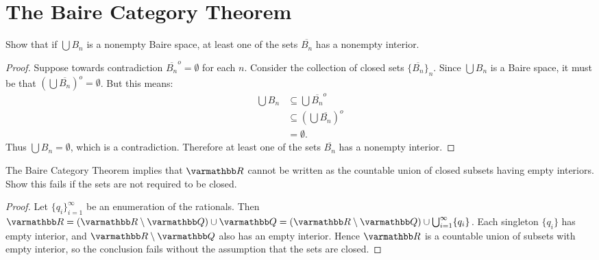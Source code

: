 \documentclass[10pt,twoside,openany]{memoir}
\begin{document}
\newpage
\chapter{The Baire Category Theorem}

\begin{problem}
Show that if $\bigcup B_n$ is a nonempty Baire space, at least one of the sets $\overline{B_n}$ has a nonempty interior.
\end{problem}
    \begin{proof}
        Suppose towards contradiction $\overline{B_n}^o = \emptyset$ for each $n$. Consider the collection of closed sets $\{\overline{B_n}\}_n$. Since $\bigcup B_n$ is a Baire space, it must be that $\left(\bigcup \overline{B_n}\right)^o = \emptyset$. But this means:
            \begin{equation*}
            \begin{split}
                \bigcup B_n 
                & \subseteq \bigcup \overline{B_n}^o \\
                & \subseteq \left( \bigcup \overline{B_n} \right)^o \\
                & = \emptyset.
            \end{split}
            \end{equation*}
        Thus $\bigcup B_n = \emptyset$, which is a contradiction. Therefore at least one of the sets $\overline{B_n}$ has a nonempty interior.
    \end{proof}

\begin{problem}
The Baire Category Theorem implies that $\bfR$ cannot be written as the countable union of closed subsets having empty interiors. Show this fails if the sets are not required to be closed.
\end{problem}
\begin{proof}
    Let $\{q_i\}_{i = 1}^\infty$ be an enumeration of the rationals. Then $\bfR = (\bfR \setminus \bfQ) \cup \bfQ = (\bfR \setminus \bfQ) \cup \bigcup_{i = 1}^\infty \{q_i\}$. Each singleton $\{q_i\}$ has empty interior, and $\bfR\setminus \bfQ$ also has an empty interior. Hence $\bfR$ is a countable union of subsets with empty interior, so the conclusion fails without the assumption that the sets are closed.
\end{proof}
\end{document}
